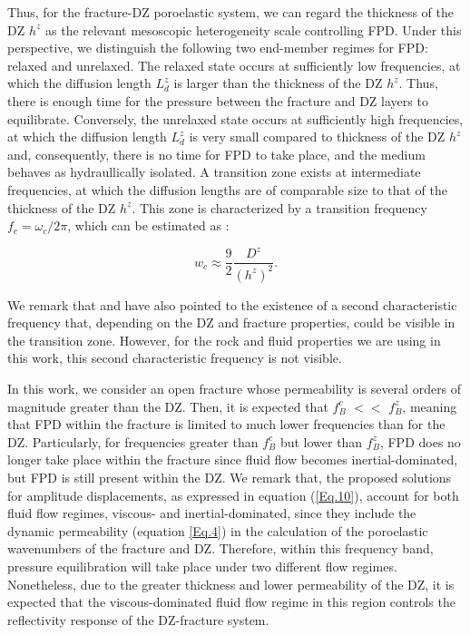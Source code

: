\documentclass[draft]{agujournal2019}
\begin{document}
Thus, for the fracture-DZ poroelastic system, we can regard the thickness of the DZ $h^z$ as the relevant mesoscopic heterogeneity scale controlling FPD. Under this perspective, we  distinguish the following two end-member regimes for FPD: relaxed and unrelaxed. The relaxed state occurs at sufficiently low  frequencies, at which the diffusion length $L_d^z$ is larger than the thickness of the DZ $h^z$.
Thus, there is enough time for the pressure between the fracture and DZ layers to equilibrate. Conversely, the unrelaxed state occurs at sufficiently high frequencies, at which the diffusion length $L_d^z$ is very small compared to thickness of the DZ $h^z$ and, consequently, there is no time for FPD to take place, and the medium behaves as hydraullically isolated. A transition zone exists at intermediate frequencies, at which the diffusion lengths are of comparable size to that of the thickness of the DZ $h^z$. This zone is characterized by a transition frequency $f_c = \omega_c /2 \pi$, which can be estimated as \cite{Brajanovski2006, Muller2006}: 
\begin{linenomath*}
\begin{equation}\label{Eq.21}
   w_c \approx  \frac{9}{2} \frac{D^z}{(h^z)^2}.
\end{equation}
\end{linenomath*}
We remark that  and  have also pointed to the existence of a second characteristic frequency that, depending on the DZ and fracture properties, could be visible in the transition zone. However, 
for the rock and fluid properties we are using in this work, this second characteristic frequency is not visible.

In this work, we consider an open fracture whose permeability is several orders of magnitude greater than the DZ. Then, it is expected that $f_B^c$ $<<$ $f_B^z$, meaning that FPD within the fracture is limited to much lower frequencies than for the DZ. Particularly, for frequencies greater than $f_B^c$ but lower than $f_B^z$, FPD does no longer take place within the fracture since fluid flow becomes inertial-dominated, but FPD is still present within the DZ.  We remark that, the proposed solutions for amplitude displacements, as expressed in equation (\ref{Eq.10}), account for both fluid flow regimes, viscous- and inertial-dominated, since they include the dynamic permeability (equation \ref{Eq.4}) in the calculation of the poroelastic wavenumbers  of the fracture and DZ. Therefore,
within this frequency band, pressure equilibration will take place under two different flow regimes. Nonetheless, due to the greater thickness and lower permeability of the DZ, it is expected that the viscous-dominated fluid flow regime in this region controls the reflectivity response of the DZ-fracture system.
\end{document}
